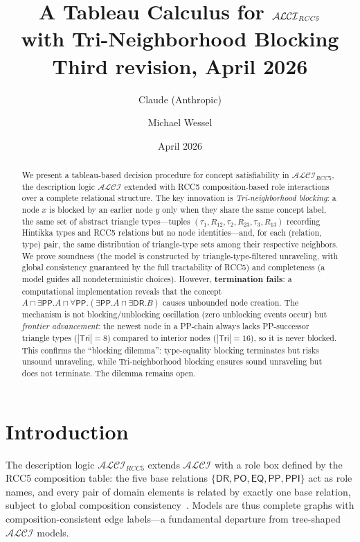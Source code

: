 \documentclass[a4paper,11pt]{article}
\title{A Tableau Calculus for $\ALCIRCC{5}$\\
  with Tri-Neighborhood Blocking\\[4pt]
  \large Third revision, April 2026}
\author{Claude (Anthropic) \and Michael Wessel}
\date{April 2026}
\theoremstyle{definition}
\newcommand{\ALCI}{\ensuremath{\mathcal{ALCI}}}
\newcommand{\ALCIRCC}[1]{\ensuremath{\mathcal{ALCI}_{\mathit{RCC#1}}}}
\newcommand{\DR}{\ensuremath{\mathsf{DR}}}
\newcommand{\PO}{\ensuremath{\mathsf{PO}}}
\newcommand{\EQ}{\ensuremath{\mathsf{EQ}}}
\newcommand{\PP}{\ensuremath{\mathsf{PP}}}
\newcommand{\PPI}{\ensuremath{\mathsf{PPI}}}
\newcommand{\Tri}{\ensuremath{\mathsf{Tri}}}
\begin{document}
\maketitle

\begin{abstract}
We present a tableau-based decision procedure for concept
satisfiability in $\ALCIRCC{5}$, the description logic $\ALCI$
extended with RCC5 composition-based role interactions over a
complete relational structure. The key innovation is
\emph{Tri-neighborhood blocking}: a node $x$ is blocked by an
earlier node $y$ only when they share the same concept label,
the same set of abstract triangle types---tuples
$(\tau_1, R_{12}, \tau_2, R_{23}, \tau_3, R_{13})$ recording
Hintikka types and RCC5 relations but no node identities---and,
for each (relation, type) pair, the same distribution of
triangle-type sets among their respective neighbors.
We prove soundness (the model is constructed
by triangle-type-filtered unraveling, with global consistency
guaranteed by the full tractability of RCC5) and completeness
(a model guides all nondeterministic choices).
However, \textbf{termination fails}: a computational
implementation reveals that the concept
$A \sqcap \exists\PP.A \sqcap \forall\PP.(\exists\PP.A
\sqcap \exists\DR.B)$ causes unbounded node creation.
The mechanism is not blocking/unblocking oscillation (zero
unblocking events occur) but \emph{frontier advancement}:
the newest node in a PP-chain always lacks PP-successor
triangle types ($|\Tri| = 8$) compared to interior
nodes ($|\Tri| = 16$), so it is never blocked.
This confirms the ``blocking dilemma'': type-equality
blocking terminates but risks unsound unraveling, while
Tri-neighborhood blocking ensures sound unraveling but
does not terminate.  The dilemma remains open.
\end{abstract}


\section{Introduction}\label{sec:intro}

The description logic $\ALCIRCC{5}$ extends $\ALCI$ with a
role box defined by the RCC5 composition table: the five base
relations $\{\DR, \PO, \EQ, \PP, \PPI\}$ act as role names,
and every pair of domain elements is related by exactly one
base relation, subject to global composition
consistency~\cite{Wessel2002}.  Models are thus complete
graphs with composition-consistent edge labels---a fundamental
departure from tree-shaped $\ALCI$ models.
\end{document}
